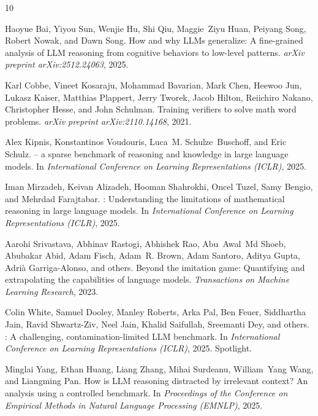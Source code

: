 \documentclass{article}
\begin{document}
\begin{thebibliography}{10}

Haoyue Bai, Yiyou Sun, Wenjie Hu, Shi Qiu, Maggie~Ziyu Huan, Peiyang Song, Robert Nowak, and Dawn Song.
\newblock How and why {LLM}s generalize: A fine-grained analysis of {LLM} reasoning from cognitive behaviors to low-level patterns.
\newblock \emph{arXiv preprint arXiv:2512.24063}, 2025.

Karl Cobbe, Vineet Kosaraju, Mohammad Bavarian, Mark Chen, Heewoo Jun, Lukasz Kaiser, Matthias Plappert, Jerry Tworek, Jacob Hilton, Reiichiro Nakano, Christopher Hesse, and John Schulman.
\newblock Training verifiers to solve math word problems.
\newblock \emph{arXiv preprint arXiv:2110.14168}, 2021.

Alex Kipnis, Konstantinos Voudouris, Luca~M. Schulze~Buschoff, and Eric Schulz.
 -- a sparse benchmark of reasoning and knowledge in large language models.
\newblock In \emph{International Conference on Learning Representations (ICLR)}, 2025.

Iman Mirzadeh, Keivan Alizadeh, Hooman Shahrokhi, Oncel Tuzel, Samy Bengio, and Mehrdad Farajtabar.
: Understanding the limitations of mathematical reasoning in large language models.
\newblock In \emph{International Conference on Learning Representations (ICLR)}, 2025.

Aarohi Srivastava, Abhinav Rastogi, Abhishek Rao, Abu~Awal~Md Shoeb, Abubakar Abid, Adam Fisch, Adam~R. Brown, Adam Santoro, Aditya Gupta, Adri\`{a} Garriga-Alonso, and others.
\newblock Beyond the imitation game: Quantifying and extrapolating the capabilities of language models.
\newblock \emph{Transactions on Machine Learning Research}, 2023.

Colin White, Samuel Dooley, Manley Roberts, Arka Pal, Ben Feuer, Siddhartha Jain, Ravid Shwartz-Ziv, Neel Jain, Khalid Saifullah, Sreemanti Dey, and others.
: A challenging, contamination-limited {LLM} benchmark.
\newblock In \emph{International Conference on Learning Representations (ICLR)}, 2025.
\newblock Spotlight.

Minglai Yang, Ethan Huang, Liang Zhang, Mihai Surdeanu, William~Yang Wang, and Liangming Pan.
\newblock How is {LLM} reasoning distracted by irrelevant context? {A}n analysis using a controlled benchmark.
\newblock In \emph{Proceedings of the Conference on Empirical Methods in Natural Language Processing (EMNLP)}, 2025.


\end{thebibliography}
\end{document}
